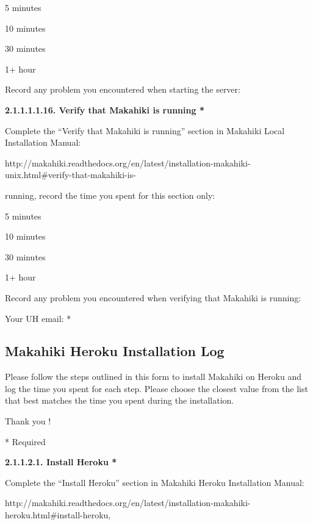 \begin{radiobutton}
\item 5 minutes
\item  10 minutes
\item  30 minutes
\item  1+ hour
\end{radiobutton}

Record any problem you encountered when starting the server: \underline{\hspace{4cm}}

{\bf 2.1.1.1.1.16. Verify that Makahiki is running *}

Complete the ``Verify that Makahiki is running'' section in Makahiki Local Installation Manual:

http://makahiki.readthedocs.org/en/latest/installation-makahiki-unix.html\#verify-that-makahiki-is-

running,  record the time you spent for this section only:

\begin{radiobutton}
\item 5 minutes
\item  10 minutes
\item  30 minutes
\item  1+ hour
\end{radiobutton}

Record any problem you encountered when verifying that Makahiki is running: \underline{\hspace{3cm}}

Your UH email: * \underline{\hspace{4cm}}

\subsection{Makahiki Heroku Installation Log}

Please follow the steps outlined in this form to install Makahiki on Heroku and log the time you spent for each step.
Please choose the closest value from the list that best matches the time you spent during the installation.

Thank you !

* Required

{\bf 2.1.1.2.1. Install Heroku *}

Complete the ``Install Heroku'' section in Makahiki Heroku Installation Manual:

http://makahiki.readthedocs.org/en/latest/installation-makahiki-heroku.html\#install-heroku, 

